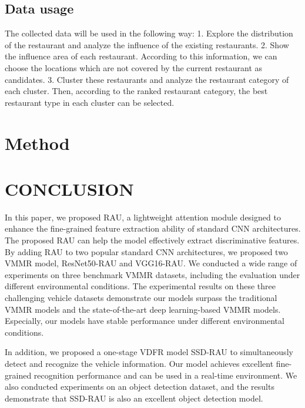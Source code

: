 \documentclass[14pt, conference, onecolumn]{IEEEtran}
\begin{document}
\subsection{Data usage}
The collected data will be used in the following way: 
1. Explore the distribution of the restaurant and analyze the influence of the existing restaurants. 
2. Show the influence area of each restaurant. According to this information, we can choose the locations which are not covered by the current restaurant as candidates.
3. Cluster these restaurants and analyze the restaurant category of each cluster. Then, according to the ranked restaurant category, the best restaurant type in each cluster can be selected.

\section{Method}

\section{CONCLUSION}
\label{sec:conclusion}
In this paper, we proposed RAU, a lightweight attention module designed to enhance the fine-grained feature extraction ability of standard CNN architectures. The proposed RAU can help the model effectively extract discriminative features. By adding RAU to two popular standard CNN architectures, we proposed two VMMR model, ResNet50-RAU and VGG16-RAU. We conducted a wide range of experiments on three benchmark VMMR datasets, including the evaluation under different environmental conditions. The experimental results on these three challenging vehicle datasets demonstrate our models surpass the traditional VMMR models and the state-of-the-art deep learning-based VMMR models. Especially, our models have stable performance under different environmental conditions. 

In addition, we proposed a one-stage VDFR model SSD-RAU to simultaneously detect and recognize the vehicle information. Our model achieves excellent fine-grained recognition performance and can be used in a real-time environment. We also conducted experiments on an object detection dataset, and the results demonstrate that SSD-RAU is also an excellent object detection model.






\end{document}
